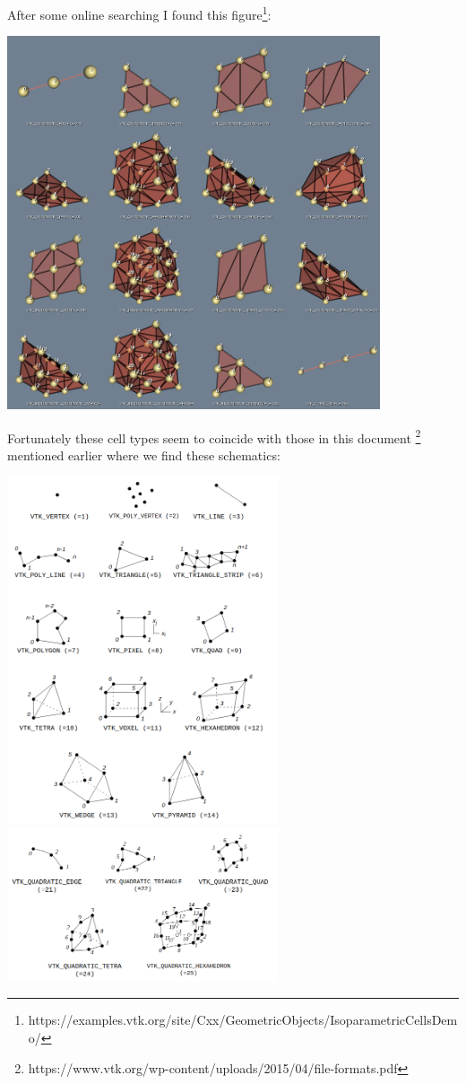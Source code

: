 After some online searching I found this figure\footnote{{https://examples.vtk.org/site/Cxx/GeometricObjects/IsoparametricCellsDemo/}}:

\begin{center}
\includegraphics[width=11cm]{images/vtk/TestIsoparametricCellsDemo.png}
\end{center}




Fortunately these cell types seem to coincide with those in this document
\footnote{https://www.vtk.org/wp-content/uploads/2015/04/file-formats.pdf}
mentioned earlier where we find these schematics:

\begin{center}
\includegraphics[width=8cm]{images/vtk/types1}
\includegraphics[width=8cm]{images/vtk/types2}
\end{center}







